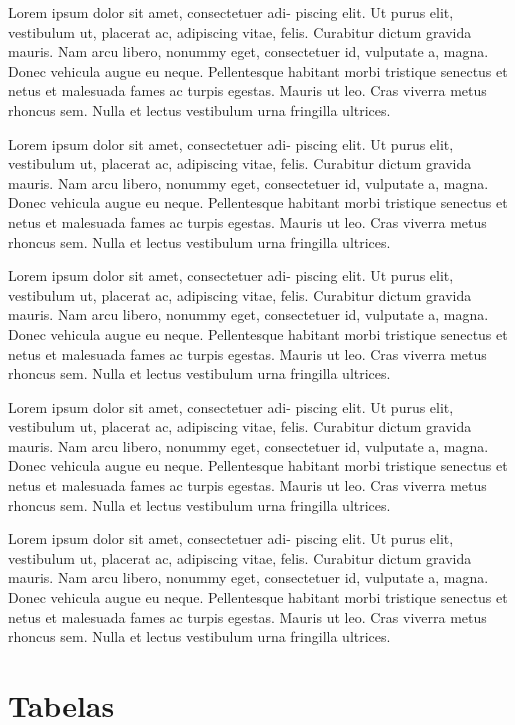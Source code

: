 \begin{question}[type={exam}]{2}
Lorem ipsum dolor sit amet, consectetuer adi-
piscing elit. Ut purus elit, vestibulum ut, placerat ac, adipiscing vitae,
felis. Curabitur dictum gravida mauris. Nam arcu libero, nonummy
eget, consectetuer id, vulputate a, magna. Donec vehicula augue
eu neque. Pellentesque habitant morbi tristique senectus et netus
et malesuada fames ac turpis egestas. Mauris ut leo. Cras viverra
metus rhoncus sem. Nulla et lectus vestibulum urna fringilla ultrices.
\end{question}

\begin{question}[type={exam}]{2}
Lorem ipsum dolor sit amet, consectetuer adi-
piscing elit. Ut purus elit, vestibulum ut, placerat ac, adipiscing vitae,
felis. Curabitur dictum gravida mauris. Nam arcu libero, nonummy
eget, consectetuer id, vulputate a, magna. Donec vehicula augue
eu neque. Pellentesque habitant morbi tristique senectus et netus
et malesuada fames ac turpis egestas. Mauris ut leo. Cras viverra
metus rhoncus sem. Nulla et lectus vestibulum urna fringilla ultrices.
\end{question}

\begin{question}[type={exam}]{2}
Lorem ipsum dolor sit amet, consectetuer adi-
piscing elit. Ut purus elit, vestibulum ut, placerat ac, adipiscing vitae,
felis. Curabitur dictum gravida mauris. Nam arcu libero, nonummy
eget, consectetuer id, vulputate a, magna. Donec vehicula augue
eu neque. Pellentesque habitant morbi tristique senectus et netus
et malesuada fames ac turpis egestas. Mauris ut leo. Cras viverra
metus rhoncus sem. Nulla et lectus vestibulum urna fringilla ultrices.
\end{question}

\begin{question}[type={exam}]{2}
Lorem ipsum dolor sit amet, consectetuer adi-
piscing elit. Ut purus elit, vestibulum ut, placerat ac, adipiscing vitae,
felis. Curabitur dictum gravida mauris. Nam arcu libero, nonummy
eget, consectetuer id, vulputate a, magna. Donec vehicula augue
eu neque. Pellentesque habitant morbi tristique senectus et netus
et malesuada fames ac turpis egestas. Mauris ut leo. Cras viverra
metus rhoncus sem. Nulla et lectus vestibulum urna fringilla ultrices.
\end{question}

\begin{question}[type={exam}]{2}
Lorem ipsum dolor sit amet, consectetuer adi-
piscing elit. Ut purus elit, vestibulum ut, placerat ac, adipiscing vitae,
felis. Curabitur dictum gravida mauris. Nam arcu libero, nonummy
eget, consectetuer id, vulputate a, magna. Donec vehicula augue
eu neque. Pellentesque habitant morbi tristique senectus et netus
et malesuada fames ac turpis egestas. Mauris ut leo. Cras viverra
metus rhoncus sem. Nulla et lectus vestibulum urna fringilla ultrices.
\end{question}
\vfill
\pagebreak
\section{Tabelas}

